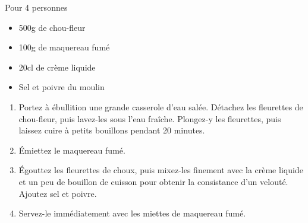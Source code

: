 \bigskip
{}
{Pour 4 personnes}{\begin{itemize}
	\item 500g de chou-fleur
	\item 100g de maquereau fumé
	\item 20cl de crème liquide
	\item Sel et poivre du moulin
\end{itemize}}
{\begin{enumerate}
	\item Portez à ébullition une grande casserole d'eau salée. Détachez les fleurettes de chou-fleur, puis lavez-les sous l'eau fraîche. Plongez-y les fleurettes, puis laissez cuire à petits bouillons pendant 20 minutes.
	\item Émiettez le maquereau fumé.
	\item Égouttez les fleurettes de choux, puis mixez-les finement avec la crème liquide et un peu de bouillon de cuisson pour obtenir la consistance d'un velouté. Ajoutez sel et poivre.
	\item Servez-le immédiatement avec les miettes de maquereau fumé.
\end{enumerate}}
